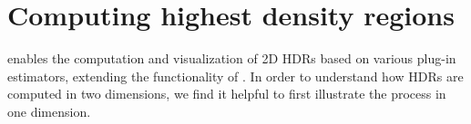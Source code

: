 


\section{Computing highest density regions}\label{sec:computing}






 enables the computation and visualization of 2D HDRs based on various plug-in estimators, extending the functionality of .
In order to understand how HDRs are computed in two dimensions, we find it helpful to first illustrate the process in one dimension.


